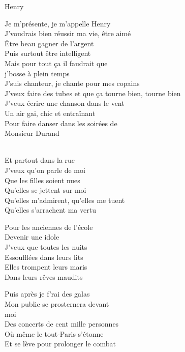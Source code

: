 \documentclass{novel}
\begin{document}
\newpage
\normalsize
\h*{Henry}
\begin{multicols}{2}
Je m'présente, je m'appelle Henry\\
J'voudrais bien réussir ma vie, être aimé\\
Être beau gagner de l'argent\\
Puis surtout être intelligent\\
Mais pour tout ça il faudrait que\\
j'bosse à plein temps\\

J'suis chanteur, je chante pour mes copains\\
J'veux faire des tubes et que ça tourne bien, tourne bien\\
J'veux écrire une chanson dans le vent\\
Un air gai, chic et entraînant\\
Pour faire danser dans les soirées de\\
Monsieur Durand\\

\begin{bfseries}
[Refrain:]\\
Et partout dans la rue\\
J'veux qu'on parle de moi\\
Que les filles soient nues\\
Qu'elles se jettent sur moi\\
Qu'elles m'admirent, qu'elles me tuent\\
Qu'elles s'arrachent ma vertu\\
\end{bfseries}

Pour les anciennes de l'école\\
Devenir une idole\\
J'veux que toutes les nuits\\
Essoufflées dans leurs lits\\
Elles trompent leurs maris\\
Dans leurs rêves maudits\\
\columnbreak

Puis après je f'rai des galas\\
Mon public se prosternera devant\\
moi\\
Des concerts de cent mille personnes\\
Où même le tout-Paris s'étonne\\
Et se lève pour prolonger le combat\\


\end{multicols}
\end{document}
